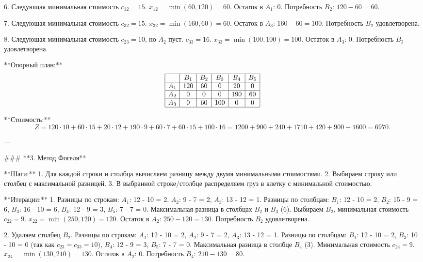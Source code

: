 6. Следующая минимальная стоимость \( c_{12} = 15 \).  
   \( x_{12} = \min(60, 120) = 60 \).  
   Остаток в \( A_1 \): 0.  
   Потребность \( B_2 \): \( 120 - 60 = 60 \).  

7. Следующая минимальная стоимость \( c_{32} = 15 \).  
   \( x_{32} = \min(160, 60) = 60 \).  
   Остаток в \( A_3 \): \( 160 - 60 = 100 \).  
   Потребность \( B_2 \) удовлетворена.  

8. Следующая минимальная стоимость \( c_{23} = 10 \), но \( A_2 \) пуст.  
   \( c_{33} = 16 \).  
   \( x_{33} = \min(100, 100) = 100 \).  
   Остаток в \( A_3 \): 0.  
   Потребность \( B_3 \) удовлетворена.  

**Опорный план:**  
\[
\begin{array}{|c|c|c|c|c|c|}
\hline
 & B_1 & B_2 & B_3 & B_4 & B_5 \\
\hline
A_1 & 120 & 60 & 0 & 20 & 0 \\
\hline
A_2 & 0 & 0 & 0 & 190 & 60 \\
\hline
A_3 & 0 & 60 & 100 & 0 & 0 \\
\hline
\end{array}
\]

**Стоимость:**  
\[
Z = 120 \cdot 10 + 60 \cdot 15 + 20 \cdot 12 + 190 \cdot 9 + 60 \cdot 7 + 60 \cdot 15 + 100 \cdot 16 = 1200 + 900 + 240 + 1710 + 420 + 900 + 1600 = 6970.
\]

---

### **3. Метод Фогеля**

**Шаги:**  
1. Для каждой строки и столбца вычисляем разницу между двумя минимальными стоимостями.  
2. Выбираем строку или столбец с максимальной разницей.  
3. В выбранной строке/столбце распределяем груз в клетку с минимальной стоимостью.  

**Итерации:**  
1. Разницы по строкам:  
   \( A_1 \): 12 - 10 = 2,  
   \( A_2 \): 9 - 7 = 2,  
   \( A_3 \): 13 - 12 = 1.  
   Разницы по столбцам:  
   \( B_1 \): 12 - 10 = 2,  
   \( B_2 \): 15 - 9 = 6,  
   \( B_3 \): 16 - 10 = 6,  
   \( B_4 \): 12 - 9 = 3,  
   \( B_5 \): 7 - 7 = 0.  
   Максимальная разница в столбцах \( B_2 \) и \( B_3 \) (6). Выбираем \( B_2 \), минимальная стоимость \( c_{22} = 9 \).  
   \( x_{22} = \min(250, 120) = 120 \).  
   Остаток в \( A_2 \): \( 250 - 120 = 130 \).  
   Потребность \( B_2 \) удовлетворена.  

2. Удаляем столбец \( B_2 \).  
   Разницы по строкам:  
   \( A_1 \): 12 - 10 = 2,  
   \( A_2 \): 9 - 7 = 2,  
   \( A_3 \): 13 - 12 = 1.  
   Разницы по столбцам:  
   \( B_1 \): 12 - 10 = 2,  
   \( B_3 \): 10 - 10 = 0 (так как \( c_{23} = c_{33} = 10 \)),  
   \( B_4 \): 12 - 9 = 3,  
   \( B_5 \): 7 - 7 = 0.  
   Максимальная разница в столбце \( B_4 \) (3). Минимальная стоимость \( c_{24} = 9 \).  
   \( x_{24} = \min(130, 210) = 130 \).  
   Остаток в \( A_2 \): 0.  
   Потребность \( B_4 \): \( 210 - 130 = 80 \).  


